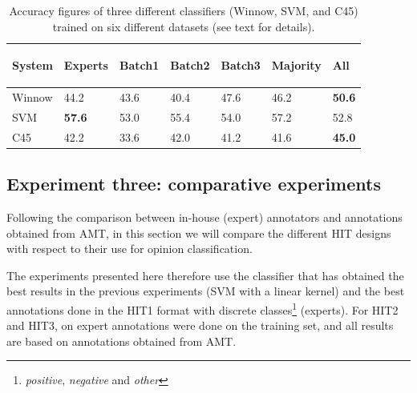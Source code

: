 \documentclass[11pt]{elsarticle}
\begin{document}
\begin{table}
\begin{center}
\begin{small}
\begin{tabular}{|l|l|l|l|l|l|l|} \hline
 System &
 {\begin{sideways}\parbox{2cm}{\centering Experts}\end{sideways}} &
 {\begin{sideways}\parbox{2cm}{\centering Batch1}\end{sideways}} &
 {\begin{sideways}\parbox{2cm}{\centering Batch2}\end{sideways}} &
 {\begin{sideways}\parbox{2cm}{\centering Batch3}\end{sideways}} &
 {\begin{sideways}\parbox{2cm}{\centering Majority}\end{sideways}} &
 {\begin{sideways}\parbox{2cm}{\centering All}\end{sideways}} \\ \hline
 Winnow & 44.2 & 43.6 & 40.4 & 47.6 & 46.2 & \textbf{50.6} \\ \hline
 SVM & \textbf{57.6} & 53.0 & 55.4 & 54.0 & 57.2 & 52.8 \\ \hline
 C45 & 42.2 & 33.6 & 42.0 & 41.2 & 41.6 & \textbf{45.0} \\ \hline
\end{tabular}
\end{small}
\end{center}
\caption{Accuracy figures of three different classifiers (Winnow, SVM, and C45) trained on six different datasets (see text for details).}
\label{table:amtvsexp}
\end{table}



\subsection{Experiment three: comparative experiments}
\label{sect:eval3}

Following the comparison between in-house (expert) annotators and annotations obtained from AMT, in this section we will compare the different HIT designs with respect to their use for opinion classification.

The experiments presented here therefore use the classifier that has obtained the best results in the previous experiments (SVM with a linear kernel) and the best annotations done in the HIT1 format with discrete classes\footnote{\emph{positive}, \emph{negative} and \emph{other}} (experts). For HIT2 and HIT3, on expert annotations were done on the training set, and all results are based on annotations obtained from AMT.
\end{document}

